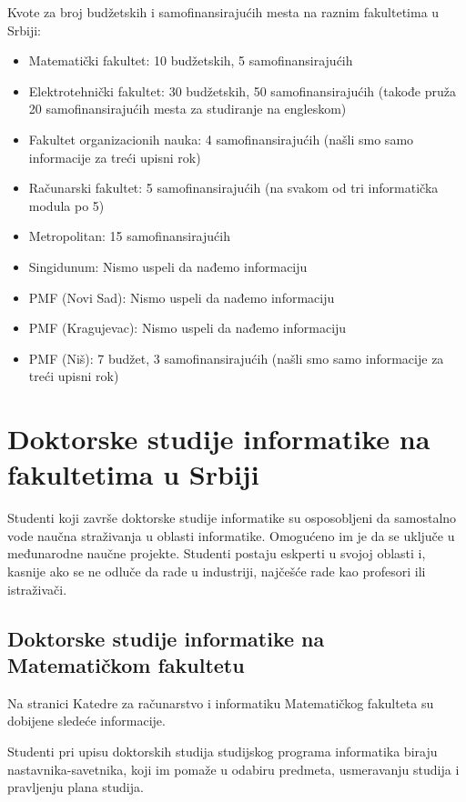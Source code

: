 \documentclass[a4paper]{article}
\begin{document}
Kvote za broj budžetskih i samofinansirajućih mesta na raznim fakultetima u Srbiji: 
\begin{itemize}
\item
Matematički fakultet: 10 budžetskih, 5 samofinansirajućih
\item
Elektrotehnički fakultet: 30 budžetskih, 50 samofinansirajućih (takođe pruža 20 samofinansirajućih mesta za studiranje na engleskom)
\item
Fakultet organizacionih nauka: 4 samofinansirajućih (našli smo samo informacije za treći upisni rok)
\item
Računarski fakultet: 5 samofinansirajućih (na svakom od tri informatička modula po 5)
\item
Metropolitan: 15 samofinansirajućih
\item
Singidunum: Nismo uspeli da nađemo informaciju
\item
PMF (Novi Sad): Nismo uspeli da nađemo informaciju
\item
PMF (Kragujevac): Nismo uspeli da nađemo informaciju
\item
PMF (Niš): 7 budžet, 3 samofinansirajućih (našli smo samo informacije za treći upisni rok)

\end{itemize}


\section{Doktorske studije informatike na fakultetima u Srbiji}
\label{sec:fakulteti}

Studenti koji završe doktorske studije informatike su osposobljeni da samostalno vode naučna straživanja u oblasti informatike. Omogućeno im je da se uključe u međunarodne naučne projekte. Studenti postaju eskperti u svojoj oblasti i, kasnije ako se ne odluče da rade u industriji, najčešće rade kao profesori ili istraživači.

\subsection{Doktorske studije informatike na Matematičkom fakultetu}

Na stranici Katedre za računarstvo i informatiku Matematičkog fakulteta su dobijene sledeće informacije\cite{katedraweb}. 

Studenti pri upisu doktorskih studija studijskog programa informatika biraju nastavnika-savetnika, koji im pomaže u odabiru predmeta, usmeravanju studija i pravljenju plana studija.
\end{document}
